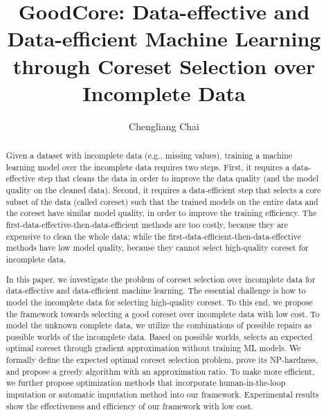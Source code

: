 \documentclass[acmsmall]{acmart}
\begin{document}
\title{GoodCore: Data-effective and Data-efficient Machine Learning through Coreset Selection over Incomplete Data}

\author{Chengliang Chai}



\begin{abstract}
Given a dataset with incomplete data (e.g., missing values), training a machine learning model over the incomplete data requires two steps. First,  it requires a data-effective step that cleans the data in order to improve the data quality (and the model quality on the cleaned data). Second, it requires a data-efficient step that selects a core subset of the data (called coreset) such that the trained models on the entire data and the coreset have similar model quality, in order to improve the training efficiency. The first-data-effective-then-data-efficient methods are too costly, because they are expensive to clean the whole data; while the first-data-efficient-then-data-effective methods have low model quality, because they cannot select high-quality coreset for incomplete data.
	
In this paper, we investigate the problem of coreset selection over incomplete data for data-effective and data-efficient machine learning. The essential challenge is how to model the incomplete data for selecting high-quality coreset.  To this end, we propose the \ours framework towards selecting a good coreset over incomplete data with low cost. To model the unknown complete data, we utilize the combinations of possible repairs as possible worlds of the incomplete data. 	Based on possible worlds, \ours  selects an expected optimal coreset through gradient approximation without training ML models. We formally define the expected optimal coreset selection problem, prove its NP-hardness, and propose a greedy algorithm with an approximation ratio. To make \ours more efficient, we further propose optimization methods that incorporate human-in-the-loop imputation or automatic imputation method into our framework. Experimental results show the effectiveness and efficiency of our framework with low cost.
\end{abstract}
\end{document}
